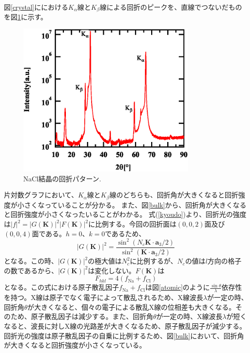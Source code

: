 \documentclass[11pt,a4j,uplatex]{jsarticle}
\begin{document}
図\ref{crystal}ににおける$K_\alpha$線と$K_\beta$線による回折のピークを、直線でつないだものを図\ref{kakb}に示す。

 \begin{figure}[htb]
  \centering
  \includegraphics[clip,width=9cm]{kakb.eps}
  \caption{NaCl結晶の回折パターン.}
  \label{kakb}
 \end{figure}

片対数グラフにおいて、$K_\alpha$線と$K_\beta$線のどちらも、回折角が大きくなると回折強度が小さくなっていることが分かる。
\fi
また、図\ref{bulk}から、回折角が大きくなると回折強度が小さくなったいることがわかる。
式(\ref{kyoudo})より、回折光の強度は${|f|}^2={|G\bm{(K)}|^2}{|F\bm{(K)}|^2}$に比例する。今回の回折面は$(0,0,2)$面及び$(0,0,4)$面である。$h=0、k=0$であるため、
\begin{equation}
  |G(\bm{K})|^2=\frac{\sin^2(N_c\bm{K}\cdot\bm{a}_3/2)}{\sin^2(\bm{K}\cdot\bm{a}_3/2)}
\end{equation}
となる。この時、$|G(\bm{K})|^2$の極大値は$N_c^2$に比例するが、$N_c$の値は$l$方向の格子の数であるから、$|G(\bm{K})|^2$は変化しない。$F(\bm{K})$は
\begin{equation}
  F_{hkl}=4(f_{\mathrm{Na}}+f_{\mathrm{Cl}})
\end{equation}
となる。この式における原子散乱因子$f_{\mathrm{Na}}+f_{\mathrm{Cl}}$は図\ref{atomic}のように$\frac{\sin\theta}{\lambda}$依存性を持つ\cite{atom}。X線は原子でなく電子によって散乱されるため、X線波長$\lambda$が一定の時、回折角$\theta$が大きくなると、個々の電子による散乱X線の位相差も大きくなる。そのため、原子散乱因子は減少する。また、回折角$\theta$が一定の時、X線波長$\lambda$が短くなると、波長に対しX線の光路差が大きくなるため、原子散乱因子が減少する。回折光の強度は原子散乱因子の自乗に比例するため、図\ref{bulk}において、回折角が大きくなると回折強度が小さくなっている。
\end{document}
